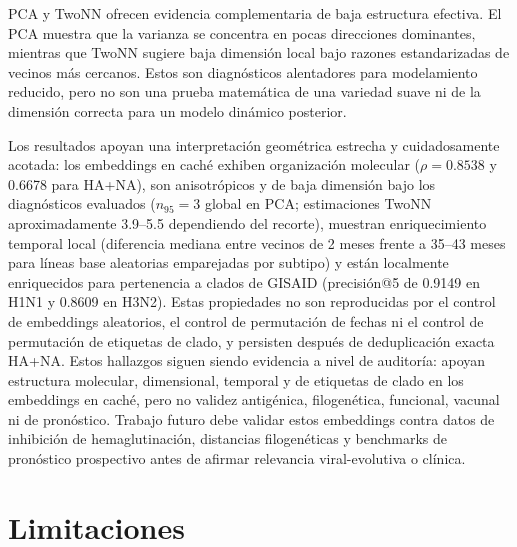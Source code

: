 \documentclass[11pt]{article}
\begin{document}
PCA y TwoNN ofrecen evidencia complementaria de baja estructura efectiva. El PCA muestra que la varianza se concentra en pocas direcciones dominantes, mientras que TwoNN sugiere baja dimensión local bajo razones estandarizadas de vecinos más cercanos. Estos son diagnósticos alentadores para modelamiento reducido, pero no son una prueba matemática de una variedad suave ni de la dimensión correcta para un modelo dinámico posterior.

Los resultados apoyan una interpretación geométrica estrecha y cuidadosamente acotada: los embeddings en caché exhiben organización molecular ($\rho=0.8538$ y 0.6678 para HA+NA), son anisotrópicos y de baja dimensión bajo los diagnósticos evaluados ($n_{95}=3$ global en PCA; estimaciones TwoNN aproximadamente 3.9--5.5 dependiendo del recorte), muestran enriquecimiento temporal local (diferencia mediana entre vecinos de 2 meses frente a 35--43 meses para líneas base aleatorias emparejadas por subtipo) y están localmente enriquecidos para pertenencia a clados de GISAID (precisión@5 de 0.9149 en H1N1 y 0.8609 en H3N2). Estas propiedades no son reproducidas por el control de embeddings aleatorios, el control de permutación de fechas ni el control de permutación de etiquetas de clado, y persisten después de deduplicación exacta HA+NA. Estos hallazgos siguen siendo evidencia a nivel de auditoría: apoyan estructura molecular, dimensional, temporal y de etiquetas de clado en los embeddings en caché, pero no validez antigénica, filogenética, funcional, vacunal ni de pronóstico. Trabajo futuro debe validar estos embeddings contra datos de inhibición de hemaglutinación, distancias filogenéticas y benchmarks de pronóstico prospectivo antes de afirmar relevancia viral-evolutiva o clínica.

\section{Limitaciones}
\end{document}

